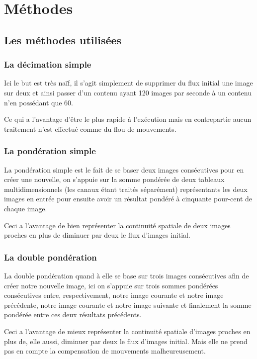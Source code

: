 \documentclass[fleqn,10pt]{SelfArx} %
\begin{document}

\section{Méthodes}

\subsection{Les méthodes utilisées}

\subsubsection{La décimation simple}
Ici le but est très naïf, il s'agit simplement de supprimer du flux initial une image sur deux et ainsi passer d'un contenu ayant 120 images par seconde à un contenu n'en possédant que 60.

Ce qui a l'avantage d'être le plus rapide à l'exécution mais en contrepartie aucun traitement n'est effectué comme du flou de mouvements.

\subsubsection{La pondération simple}
La pondération simple est le fait de se baser deux images consécutives pour en créer une nouvelle, on s'appuie sur la somme pondérée de deux tableaux multidimensionnels (les canaux étant traités séparément) représentants les deux images en entrée pour ensuite avoir un résultat pondéré à cinquante pour-cent de chaque image.

Ceci a l'avantage de bien représenter la continuité spatiale de deux images proches en plus de diminuer par deux le flux d'images initial.

\subsubsection{La double pondération}
La double pondération quand à elle se base sur trois images consécutives afin de créer notre nouvelle image, ici on s'appuie sur trois sommes pondérées consécutives entre, respectivement, notre image courante et notre image précédente, notre image courante et notre image suivante et finalement la somme pondérée entre ces deux résultats précédents.

Ceci a l'avantage de mieux représenter la continuité spatiale d'images proches en plus de, elle aussi, diminuer par deux le flux d'images initial. Mais elle ne prend pas en compte la compensation de mouvements malheureusement.
\end{document}
